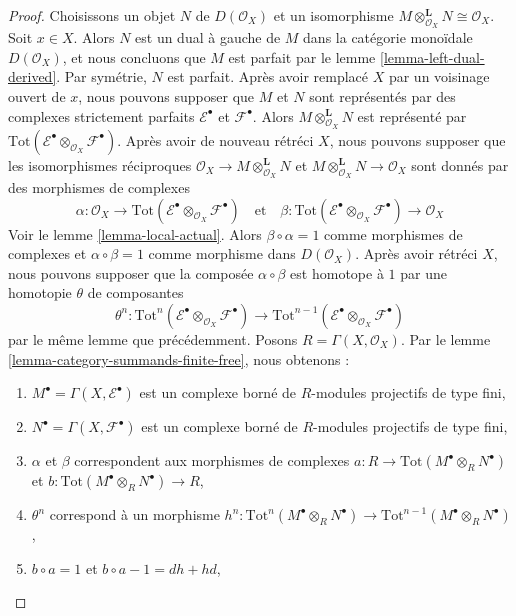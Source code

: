 \begin{proof}
Choisissons un objet $N$ de $D(\mathcal{O}_X)$
et un isomorphisme
$M \otimes_{\mathcal{O}_X}^\mathbf{L} N \cong \mathcal{O}_X$. Soit $x \in X$. Alors $N$ est un dual à gauche de $M$ dans la catégorie monoïdale
$D(\mathcal{O}_X)$, et nous concluons que $M$ est parfait par le lemme \ref{lemma-left-dual-derived}. Par symétrie,
$N$ est parfait. Après avoir remplacé $X$ par un voisinage ouvert de $x$, nous pouvons supposer que $M$ et $N$ sont représentés par des complexes strictement parfaits $\mathcal{E}^\bullet$ et $\mathcal{F}^\bullet$. Alors $M \otimes_{\mathcal{O}_X}^\mathbf{L} N$ est représenté par
$\text{Tot}(\mathcal{E}^\bullet \otimes_{\mathcal{O}_X} \mathcal{F}^\bullet)$. Après avoir de nouveau rétréci $X$, nous pouvons supposer que les isomorphismes réciproques
$\mathcal{O}_X \to M \otimes_{\mathcal{O}_X}^\mathbf{L} N$ et
$M \otimes_{\mathcal{O}_X}^\mathbf{L} N \to \mathcal{O}_X$
sont donnés par des morphismes de complexes
$$
\alpha : \mathcal{O}_X \to
\text{Tot}(\mathcal{E}^\bullet \otimes_{\mathcal{O}_X} \mathcal{F}^\bullet)
\quad\text{et}\quad
\beta :
\text{Tot}(\mathcal{E}^\bullet \otimes_{\mathcal{O}_X} \mathcal{F}^\bullet)
\to \mathcal{O}_X
$$
Voir le lemme \ref{lemma-local-actual}. Alors $\beta \circ \alpha = 1$
comme morphismes de complexes et $\alpha \circ \beta = 1$ comme morphisme dans $D(\mathcal{O}_X)$. Après avoir rétréci $X$,
nous pouvons supposer que la composée $\alpha \circ \beta$ est homotope à $1$
par une homotopie $\theta$ de composantes
$$
\theta^n :
\text{Tot}^n(\mathcal{E}^\bullet \otimes_{\mathcal{O}_X} \mathcal{F}^\bullet)
\to
\text{Tot}^{n - 1}(
\mathcal{E}^\bullet \otimes_{\mathcal{O}_X} \mathcal{F}^\bullet)
$$
par le même lemme que précédemment. Posons $R = \Gamma(X, \mathcal{O}_X)$. Par le lemme \ref{lemma-category-summands-finite-free},
nous obtenons :

\begin{enumerate}

\item  $M^\bullet = \Gamma(X, \mathcal{E}^\bullet)$ est un complexe borné de $R$-modules projectifs de type fini,
\item  $N^\bullet = \Gamma(X, \mathcal{F}^\bullet)$ est un complexe borné de $R$-modules projectifs de type fini,
\item  $\alpha$ et $\beta$ correspondent aux morphismes de complexes
$a : R \to \text{Tot}(M^\bullet \otimes_R N^\bullet)$ et
$b : \text{Tot}(M^\bullet \otimes_R N^\bullet) \to R$,
\item  $\theta^n$ correspond à un morphisme
$h^n : \text{Tot}^n(M^\bullet \otimes_R N^\bullet) \to
\text{Tot}^{n - 1}(M^\bullet \otimes_R N^\bullet)$,
\item  $b \circ a = 1$ et $b \circ a - 1 = dh + hd$,


\end{enumerate}
\end{proof}
